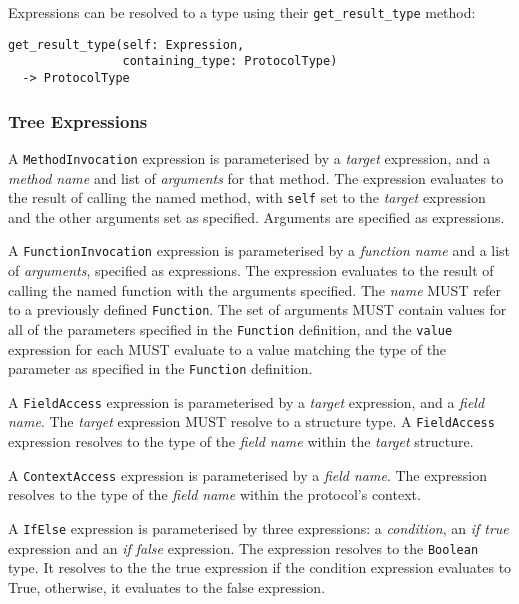 \documentclass[10pt,twocolumn,a4paper]{article}
\newcommand{\code}[1]{\texttt{#1}}
\begin{document}
Expressions can be resolved to a type using their \code{get\_result\_type} method:

\begin{verbatim}
get_result_type(self: Expression,
                containing_type: ProtocolType)
  -> ProtocolType
\end{verbatim}

\subsubsection{Tree Expressions}

A \code{MethodInvocation} expression is parameterised by a \emph{target} expression, and a 
\emph{method name} and list of \emph{arguments} for that method. The expression evaluates
to the result of calling the named method, with \code{self} set to the \emph{target}
expression and the other arguments set as specified. Arguments are specified as expressions.

A \code{FunctionInvocation} expression is parameterised by a \emph{function name} and a list of
\emph{arguments}, specified as expressions. The expression evaluates to the result of
calling the named function with the arguments specified. The \emph{name} MUST refer to
a previously defined \code{Function}. The set
of arguments MUST contain values for all of the parameters specified
in the \code{Function} definition, and the \code{value} expression for each
MUST evaluate to a value matching the type of the parameter as specified in
the \code{Function} definition. 

A \code{FieldAccess} expression is parameterised by a \emph{target} expression, and a
\emph{field name}. The \emph{target} expression MUST resolve to a structure type. A
\code{FieldAccess} expression resolves to the type of the \emph{field name} within the
\emph{target} structure.

A \code{ContextAccess} expression is parameterised by a \emph{field name}. The expression
resolves to the type of the \emph{field name} within the protocol's context.

A \code{IfElse} expression is parameterised by three expressions: a \emph{condition},
an \emph{if true} expression and an \emph{if false} expression. The expression resolves
to the \code{Boolean} type. It resolves to the the true expression if the condition
expression evaluates to True, otherwise, it evaluates to the false expression.
\end{document}
